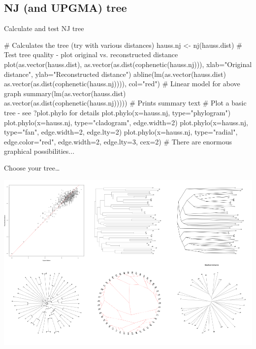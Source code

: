 \documentclass[compress, ucs, xelatex, 11pt, xcolor=svgnames,
  hyperref={
    bookmarks=true,
    unicode=true,
    colorlinks=true,
    pdftitle={Molecular data in R},
    plainpages=false,
    pdfauthor={Vojtech Zeisek},
    pdfsubject={Course about phylogeny and evolution in R},
    pdfcreator={XeLaTeX},
    pdfkeywords={R, evolution, phylogeny, molecular data},
    linkcolor=Tomato,
    anchorcolor=SaddleBrown,
    citecolor=Goldenrod,
    filecolor=DarkMagenta,
    menucolor=Sienna,
    urlcolor=DarkTurquoise,
    pdftex},
  url={hyphens, lowtilde} %
  ]{beamer}
\begin{document}
\subsection{NJ (and UPGMA) tree}

\begin{frame}[fragile]{Calculate and test NJ tree}
  \label{NJ}
  \begin{spluscode}
    # Calculates the tree (try with various distances)
    hauss.nj <- nj(hauss.dist)
    # Test tree quality - plot original vs. reconstructed distance
    plot(as.vector(hauss.dist), as.vector(as.dist(cophenetic(hauss.nj))),
      xlab="Original distance", ylab="Reconstructed distance")
    abline(lm(as.vector(hauss.dist) ~
      as.vector(as.dist(cophenetic(hauss.nj)))), col="red")
    # Linear model for above graph
    summary(lm(as.vector(hauss.dist) ~
      as.vector(as.dist(cophenetic(hauss.nj))))) # Prints summary text
    # Plot a basic tree - see ?plot.phylo for details
    plot.phylo(x=hauss.nj, type="phylogram")
    plot.phylo(x=hauss.nj, type="cladogram", edge.width=2)
    plot.phylo(x=hauss.nj, type="fan", edge.width=2, edge.lty=2)
    plot.phylo(x=hauss.nj, type="radial", edge.color="red",
      edge.width=2, edge.lty=3, cex=2)
    # There are enormous graphical possibilities...
  \end{spluscode}
\end{frame}

\begin{frame}{Choose your tree\ldots}
  \begin{center}
    \includegraphics[width=\textwidth-1.5cm]{nj1.png}
  \end{center}
\end{frame}
\end{document}
